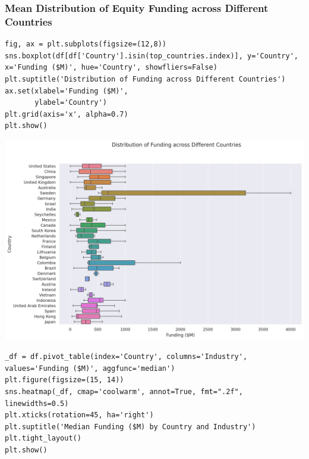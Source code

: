 \documentclass[a4paper,12pt]{article}
\begin{document}
\subsubsection{Mean Distribution of Equity Funding across Different Countries}
\label{sec:org32b4ed2}
\begin{verbatim}
fig, ax = plt.subplots(figsize=(12,8))
sns.boxplot(df[df['Country'].isin(top_countries.index)], y='Country', x='Funding ($M)', hue='Country', showfliers=False)
plt.suptitle('Distribution of Funding across Different Countries')
ax.set(xlabel='Funding ($M)',
       ylabel='Country')
plt.grid(axis='x', alpha=0.7)
plt.show()
\end{verbatim}

\begin{center}
\includegraphics[width=.9\linewidth]{./.ob-jupyter/fa05f2e0e7dfc6eb42b967ec12db60330b88785b.png}
\label{}
\end{center}

\begin{verbatim}
_df = df.pivot_table(index='Country', columns='Industry', values='Funding ($M)', aggfunc='median')
plt.figure(figsize=(15, 14))
sns.heatmap(_df, cmap='coolwarm', annot=True, fmt=".2f", linewidths=0.5)
plt.xticks(rotation=45, ha='right')
plt.suptitle('Median Funding ($M) by Country and Industry')
plt.tight_layout()
plt.show()
\end{verbatim}
\end{document}
